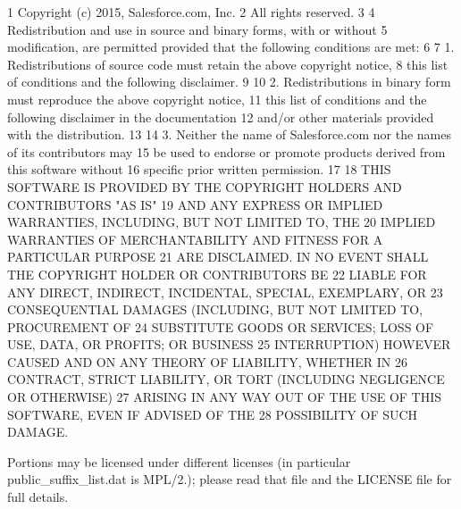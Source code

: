 \begin{DoxyCode}
1 Copyright (c) 2015, Salesforce.com, Inc.
2 All rights reserved.
3 
4 Redistribution and use in source and binary forms, with or without
5 modification, are permitted provided that the following conditions are met:
6 
7 1. Redistributions of source code must retain the above copyright notice,
8 this list of conditions and the following disclaimer.
9 
10 2. Redistributions in binary form must reproduce the above copyright notice,
11 this list of conditions and the following disclaimer in the documentation
12 and/or other materials provided with the distribution.
13 
14 3. Neither the name of Salesforce.com nor the names of its contributors may
15 be used to endorse or promote products derived from this software without
16 specific prior written permission.
17 
18 THIS SOFTWARE IS PROVIDED BY THE COPYRIGHT HOLDERS AND CONTRIBUTORS "AS IS"
19 AND ANY EXPRESS OR IMPLIED WARRANTIES, INCLUDING, BUT NOT LIMITED TO, THE
20 IMPLIED WARRANTIES OF MERCHANTABILITY AND FITNESS FOR A PARTICULAR PURPOSE
21 ARE DISCLAIMED. IN NO EVENT SHALL THE COPYRIGHT HOLDER OR CONTRIBUTORS BE
22 LIABLE FOR ANY DIRECT, INDIRECT, INCIDENTAL, SPECIAL, EXEMPLARY, OR
23 CONSEQUENTIAL DAMAGES (INCLUDING, BUT NOT LIMITED TO, PROCUREMENT OF
24 SUBSTITUTE GOODS OR SERVICES; LOSS OF USE, DATA, OR PROFITS; OR BUSINESS
25 INTERRUPTION) HOWEVER CAUSED AND ON ANY THEORY OF LIABILITY, WHETHER IN
26 CONTRACT, STRICT LIABILITY, OR TORT (INCLUDING NEGLIGENCE OR OTHERWISE)
27 ARISING IN ANY WAY OUT OF THE USE OF THIS SOFTWARE, EVEN IF ADVISED OF THE
28 POSSIBILITY OF SUCH DAMAGE.
\end{DoxyCode}


Portions may be licensed under different licenses (in particular {\ttfamily public\+\_\+suffix\+\_\+list.\+dat} is M\+P\+L/2.); please read that file and the L\+I\+C\+E\+N\+S\+E file for full details. 